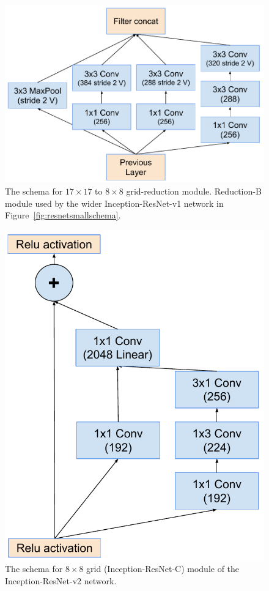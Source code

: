\begin{figure}
\centering
\includegraphics[width=\linewidth]{reductionto8resnetwide}
\caption{The schema for $17\times 17$ to $8\times 8$ grid-reduction module.
  Reduction-B module used by the wider Inception-ResNet-v1 network
  in Figure~\ref{fig:resnetsmallschema}.
}
\label{fig:reductionto8resnetwide}
\end{figure}
\begin{figure}
\centering
\includegraphics[width=\linewidth]{resnetwide8x8}
\caption{The schema for $8\times 8$ grid  (Inception-ResNet-C) module of the
 Inception-ResNet-v2 network.}
\label{fig:resnetwide8x8module}
\end{figure}
